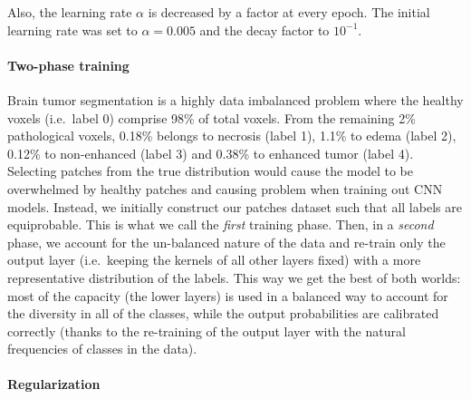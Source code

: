 \documentclass[final,5p,times,twocolumn]{elsarticle}
\begin{document}
Also, the learning rate $\alpha$ is decreased by a factor at every epoch. The initial learning rate was set to $\alpha=0.005$ and the decay factor to $10^{-1}$. %






\paragraph{Two-phase training}

\label{twopahsetraining}

Brain tumor segmentation is a highly data imbalanced problem where the healthy voxels (i.e.\ label 0) comprise 98\% of total voxels. From the remaining 2\% pathological voxels,  0.18\% belongs to necrosis (label 1), 1.1\% to edema (label 2), 0.12\% to non-enhanced (label 3) and 0.38\% to enhanced tumor (label 4). Selecting patches from the true distribution would cause the model to be overwhelmed by healthy patches and causing problem when training out CNN models. Instead, we initially construct our patches dataset such that all labels are equiprobable. This is what we call the {\em first} training phase.  Then, in a {\em second} phase, we  account for the un-balanced nature of the data and re-train only the output layer (i.e.\ keeping the kernels of all other layers fixed) with a more representative distribution of the labels. This way we get the best of both worlds: most of the capacity (the lower layers) is used in a balanced way to account for the diversity in all of the classes, while the output probabilities are calibrated correctly (thanks to the re-training of the output layer with the natural frequencies of classes in the data).



\paragraph{Regularization}
\end{document}
